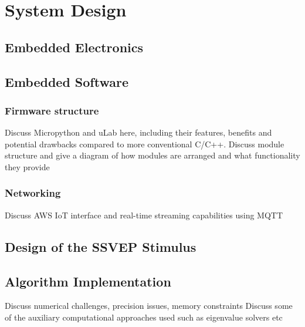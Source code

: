 \chapter{System Design}

\graphicspath{ {report/Chapter5/assets/} } 

\section{Embedded Electronics}

\section{Embedded Software}
\subsection{Firmware structure}
Discuss Micropython and uLab here, including their features, benefits and potential drawbacks compared to more conventional C/C++.
Discuss module structure and give a diagram of how modules are arranged and what functionality they provide

\subsection{Networking}
Discuss AWS IoT interface and real-time streaming capabilities using MQTT

\section{Design of the SSVEP Stimulus}

\section{Algorithm Implementation}
Discuss numerical challenges, precision issues, memory constraints
Discuss some of the auxiliary computational approaches used such as eigenvalue solvers etc

